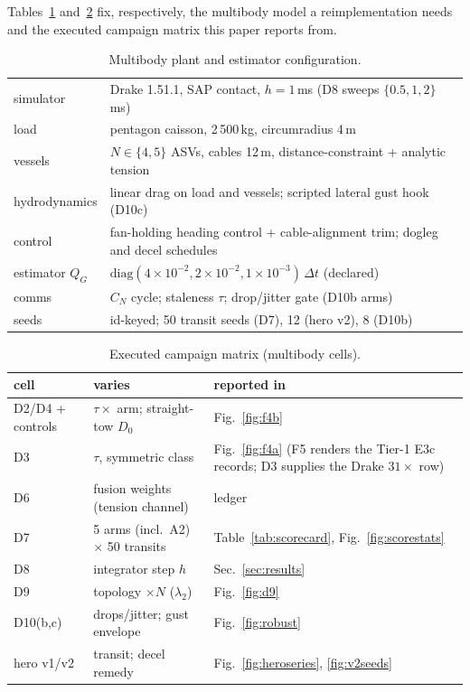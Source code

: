 \documentclass[letterpaper, 10pt, journal]{IEEEtran}
\begin{document}
Tables~\ref{tab:plantmodel} and~\ref{tab:campmatrix} fix, respectively, the
multibody model a reimplementation needs and the executed campaign matrix
this paper reports from.

\begin{table}[t]
\centering
\caption{Multibody plant and estimator configuration.}
\label{tab:plantmodel}
\begin{tabular}{ll}
\toprule
simulator & Drake 1.51.1, SAP contact, $h = 1$\,ms (D8 sweeps
$\{0.5, 1, 2\}$\,ms) \\
load & pentagon caisson, 2\,500\,kg, circumradius 4\,m \\
vessels & $N \in \{4, 5\}$ ASVs, cables 12\,m, distance-constraint +
analytic tension \\
hydrodynamics & linear drag on load and vessels; scripted lateral gust hook
(D10c) \\
control & fan-holding heading control + cable-alignment trim; dogleg and
decel schedules \\
estimator $Q_G$ & $\mathrm{diag}(4\times10^{-2}, 2\times10^{-2},
1\times10^{-3})\,\Delta t$ (declared) \\
comms & $C_N$ cycle; staleness $\tau$; drop/jitter gate (D10b arms) \\
seeds & id-keyed; 50 transit seeds (D7), 12 (hero v2), 8 (D10b) \\
\bottomrule
\end{tabular}
\end{table}

\begin{table}[t]
\centering
\caption{Executed campaign matrix (multibody cells).}
\label{tab:campmatrix}
\begin{tabular}{lll}
\toprule
cell & varies & reported in \\
\midrule
D2/D4 + controls & $\tau \times$ arm; straight-tow $D_0$ & Fig.~\ref{fig:f4b} \\
D3 & $\tau$, symmetric class & Fig.~\ref{fig:f4a} (F5 renders the Tier-1
E3c records; D3 supplies the Drake $31\times$ row) \\
D6 & fusion weights (tension channel) & ledger \\
D7 & 5 arms (incl.\ A2) $\times$ 50 transits & Table~\ref{tab:scorecard},
Fig.~\ref{fig:scorestats} \\
D8 & integrator step $h$ & Sec.~\ref{sec:results} \\
D9 & topology $\times N$ ($\lambda_2$) & Fig.~\ref{fig:d9} \\
D10(b,c) & drops/jitter; gust envelope & Fig.~\ref{fig:robust} \\
hero v1/v2 & transit; decel remedy & Fig.~\ref{fig:heroseries},
\ref{fig:v2seeds} \\
\bottomrule
\end{tabular}
\end{table}
\end{document}
